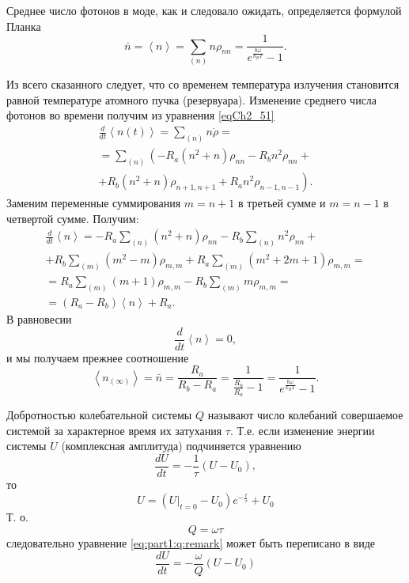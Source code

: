 Среднее число фотонов в моде, как и следовало ожидать, определяется
формулой Планка 
\begin{equation}
\bar{n} = \left<n\right> = 
\sum_{(n)} n \rho_{nn} = 
\frac{1}{ e^{\frac{\hbar \omega}{k_B T}} - 1}.
\end{equation}

Из всего сказанного следует, что со временем температура излучения
становится равной температуре атомного пучка (резервуара).  
Изменение среднего числа фотонов во времени получим из уравнения 
\eqref{eqCh2_51}
\begin{eqnarray}
\frac{d}{d t}\left<n\left(t\right)\right> = \sum_{(n)}n \dot{\rho} = 
\nonumber \\
= \sum_{(n)}\left(-R_a\left(n^2 + n\right)\rho_{nn} - R_b n^2
\rho_{nn} + \right.
\nonumber \\
+ \left.
R_b \left(n^2 + n\right) \rho_{n +1, n+ 1} +
R_a n^2 \rho_{n - 1, n - 1}
\right).
\end{eqnarray}
Заменим переменные суммирования  $m= n + 1$  в третьей сумме и  $m = n
- 1$  в четвертой сумме. Получим:
\begin{eqnarray}
\frac{d}{d t}\left<n\right> = 
-R_a \sum_{(n)}\left(n^2 + n\right)\rho_{nn}
 - R_b \sum_{(n)} n^2 \rho_{nn} +
\nonumber \\
+ R_b\sum_{(m)}\left(m^2 - m\right)\rho_{m,m} 
+ R_a\sum_{(m)}\left(m^2 +2 m + 1\right)\rho_{m,m} = 
\nonumber \\
= R_a \sum_{(m)}\left( m + 1\right)\rho_{m,m} - R_b\sum_{(m)} m
\rho_{m,m} =
\nonumber \\
= \left(R_a - R_b\right) \left<n\right> + R_a.
\label{eqCh2_57}
\end{eqnarray}
В равновесии
\[
\frac{d}{d t}\left<n\right> = 0,
\]  
и мы получаем прежнее соотношение
\begin{equation}
\left<n_{(\infty)}\right> = \bar{n} = 
\frac{R_a}{R_b - R_a} = \frac{1}{\frac{R_b}{R_a} - 1} = 
\frac{1}{e^{\frac{\hbar \omega}{k_B T}} - 1}.
\end{equation}

\begin{definition}[Добротность]
\label{def:Qfactor}
Добротностью колебательной системы $Q$ называют \cite{bKarlov2003} число колебаний
совершаемое системой за характерное время их затухания $\tau$. Т.е. если
изменение энергии системы $U$ (комплексная амплитуда) подчиняется уравнению
\begin{equation}
\label{eq:part1:q:remark}
\frac{d U}{d t} = - \frac{1}{\tau} \left(U - U_0\right),
\end{equation}
то
\[
U = \left(\left.U\right|_{t=0} - U_0 \right)e^{-\frac{t}{\tau}} + U_0
\]
Т. о. 
\[
Q = \omega \tau
\]
следовательно уравнение \eqref{eq:part1:q:remark} может быть
переписано в виде 
\[
\frac{d U}{d t} = - \frac{\omega}{Q} \left(U-U_0\right)
\]
\end{definition}


